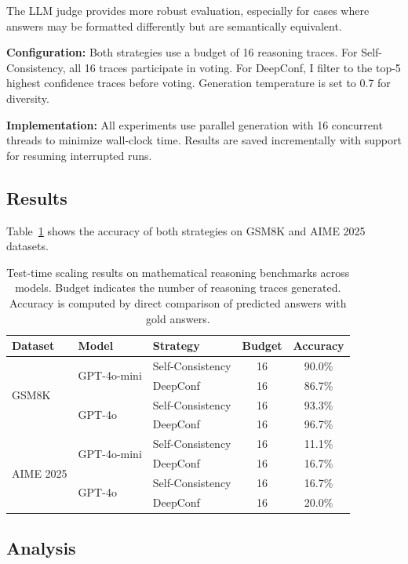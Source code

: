 \documentclass[11pt]{article}
\begin{document}
The LLM judge provides more robust evaluation, especially for cases where answers may be formatted differently but are semantically equivalent.

\textbf{Configuration:} Both strategies use a budget of 16 reasoning traces. For Self-Consistency, all 16 traces participate in voting. For DeepConf, I filter to the top-5 highest confidence traces before voting. Generation temperature is set to 0.7 for diversity.

\textbf{Implementation:} All experiments use parallel generation with 16 concurrent threads to minimize wall-clock time. Results are saved incrementally with support for resuming interrupted runs.

\subsection{Results}

Table~\ref{tab:results} shows the accuracy of both strategies on GSM8K and AIME 2025 datasets.

\begin{table}[t]
\centering
\small
\begin{tabular}{@{}lllcc@{}}
\toprule
\textbf{Dataset} & \textbf{Model} & \textbf{Strategy} & \textbf{Budget} & \textbf{Accuracy} \\
\midrule
\multirow{4}{*}{GSM8K}
& \multirow{2}{*}{GPT-4o-mini} & Self-Consistency & 16 & 90.0\% \\
& & DeepConf & 16 & 86.7\% \\
& \multirow{2}{*}{GPT-4o} & Self-Consistency & 16 & 93.3\% \\
& & DeepConf & 16 & 96.7\% \\
\midrule
\multirow{4}{*}{AIME 2025}
& \multirow{2}{*}{GPT-4o-mini} & Self-Consistency & 16 & 11.1\% \\
& & DeepConf & 16 & 16.7\% \\
& \multirow{2}{*}{GPT-4o} & Self-Consistency & 16 & 16.7\% \\
& & DeepConf & 16 & 20.0\% \\
\bottomrule
\end{tabular}
\caption{Test-time scaling results on mathematical reasoning benchmarks across models. Budget indicates the number of reasoning traces generated. Accuracy is computed by direct comparison of predicted answers with gold answers.}
\label{tab:results}
\end{table}

\subsection{Analysis}
\end{document}
